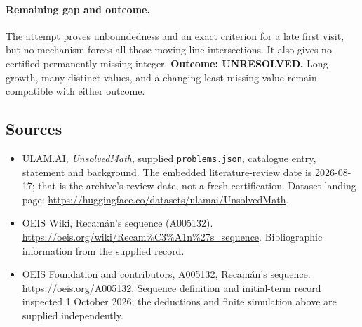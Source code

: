 \documentclass[11pt,a4paper]{article}
\begin{document}
\paragraph{Remaining gap and outcome.}
The attempt proves unboundedness and an exact criterion for a late
first visit, but no mechanism forces all those moving-line
intersections. It also gives no certified permanently missing integer.
\textbf{Outcome: UNRESOLVED.} Long growth, many distinct values, and
a changing least missing value remain compatible with either outcome.

\subsection{Sources}

{\small

\begin{itemize}

\item[\hypertarget{source:statement:1}{S1}] ULAM.AI, \emph{UnsolvedMath}, supplied \texttt{problems.json}, catalogue entry, statement and background. The embedded literature-review date is 2026-08-17; that is the archive’s review date, not a fresh certification. Dataset landing page: \url{https://huggingface.co/datasets/ulamai/UnsolvedMath}.

\item[\hypertarget{source:statement:2}{S2}] OEIS Wiki, Recamán's sequence (A005132). \url{https://oeis.org/wiki/Recam%C3%A1n%27s_sequence}. Bibliographic information from the supplied record.


\item[E1] OEIS Foundation and contributors, A005132,
Recam\'an's sequence. \url{https://oeis.org/A005132}.
Sequence definition and initial-term record inspected 1 October 2026;
the deductions and finite simulation above are supplied independently.

\end{itemize}

}

\label{end:statement}
\end{document}
